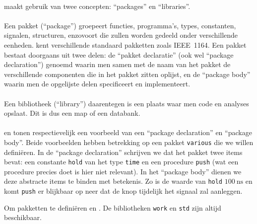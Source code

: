 \paragraph{}
\tvhdl{} maakt gebruik van twee concepten: ``packages'' en ``libraries''.

\paragraph{}
Een pakket (``package'') groepeert functies, programma's, types, constanten, signalen, structuren, enzovoort die zullen worden gedeeld onder verschillende eenheden. \tvhdl{} kent verschillende standaard pakketten zoals IEEE~1164. Een pakket bestaat doorgaans uit twee delen: de ``pakket declaratie'' (ook wel ``package declaration'') genoemd waarin men samen met de naam van het pakket de verschillende componenten die in het pakket zitten oplijst, en de ``package body'' waarin men de opgelijste delen specificeert en implementeert.

\paragraph{}
Een bibliotheek (``library'') daarentegen is een plaats waar men code en analyses opslaat. Dit is dus een map of een databank.

\paragraph{}


 en  tonen respectievelijk een voorbeeld van een ``package declaration'' en ``package body''. Beide voorbeelden hebben betrekking op een pakket \texttt{various} die we willen defini\"eren. In de ``package declaration'' schrijven we dat het pakket twee items bevat: een constante \texttt{hold} van het type \texttt{time} en een procedure \texttt{push} (wat een procedure precies doet is hier niet relevant). In het ``package body'' dienen we deze abstracte items te binden met betekenis. Zo is de waarde van \texttt{hold} $100~\mbox{ns}$ en komt \texttt{push} er blijkbaar op neer dat de knop tijdelijk het signaal  zal aanleggen.

Om pakketten te defini\"eren en . De bibliotheken \texttt{work} en \texttt{std} zijn altijd beschikbaar.

